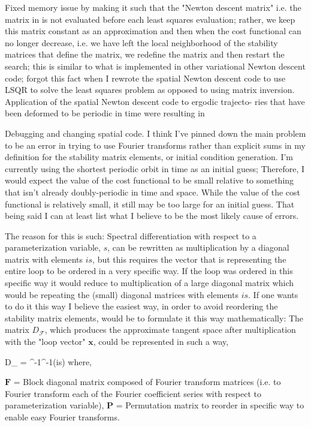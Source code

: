 Fixed memory issue by making it such that the
"Newton descent matrix" i.e. the matrix in is not evaluated
before each least squares evaluation; rather, we keep this matrix
constant as an approximation and then when the cost functional
can no longer decrease, i.e. we have left the local neighborhood of
the stability matrices that define the matrix, we redefine the matrix
and then restart the search; this is similar to what is implemented
in other variational Newton descent code; forgot this fact when I
rewrote the spatial Newton descent code to use LSQR to solve the
least squares problem as opposed to using matrix inversion.
Application of the spatial Newton descent code to ergodic trajecto-
ries that have been deformed to be periodic in time were resulting in

Debugging and changing spatial {\descent} code.
I think I've pinned down the main problem
to be an error in trying to use Fourier transforms
rather than explicit sums in my definition
for the stability matrix elements, or initial
condition generation. I'm currently using the
shortest periodic orbit in time as an initial
guess; Therefore, I would expect the value
of the cost functional to be small relative to
something that isn't already doubly-periodic
in time and space. While the value of the cost
functional is relatively small, it still may
be too large for an initial guess.
That being said I can at least list what I
 believe to be the most likely cause of errors.

The reason for this is such: Spectral differentiation with respect to a parameterization variable,
$s$, can be rewritten as multiplication by a diagonal matrix with elements $is$, but this requires
the vector that is representing the entire loop to be ordered in a very specific way. If the loop
was ordered in this specific way it would reduce to multiplication of a large diagonal matrix which would
be repeating the (small) diagonal matrices with elements $is$. If one wants to do it this way I believe
the easiest way, in order to avoid reordering the stability matrix elements, would be to formulate it
this way mathematically: The matrix $D_{\mathcal{F}}$, which produces the approximate tangent space
after multiplication with the "loop vector" $\mathbf{x}$, could be represented in such a way,

\beq \nonumber
D_{} = ^{-1}^{-1}(is) \quad
    \mbox{where,}
\label{e-FvndBAD}
\eeq

$\mathbf{F}$ = Block diagonal matrix composed of Fourier transform matrices (i.e. to Fourier transform each
of the Fourier coefficient series with respect to parameterization variable), $\mathbf{P}$ = Permutation matrix
to reorder in specific way to enable easy Fourier transforms.

